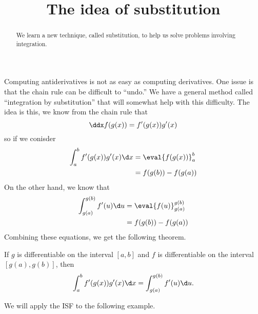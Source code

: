 \documentclass{ximera}
\title[Dig-In:]{The idea of substitution}
\begin{document}
\begin{abstract}
  We learn a new technique, called substitution, to help us solve
  problems involving integration.
\end{abstract}
\maketitle


Computing antiderivatives is not as easy as computing derivatives.
One issue is that the chain rule can be difficult to ``undo.''  We
have a general method called ``integration by substitution'' that will
somewhat help with this difficulty. The idea is this, we know from the
chain rule that
\[
\ddx f(g(x)) = f'(g(x))g'(x)
\]
so if we conisder
\begin{align*}
  \int_a^b f'(g(x))g'(x) \d x &= \eval{f(g(x))}_a^b \\
  &= f(g(b)) - f(g(a)) \\
 \end{align*}
On the other hand, we know that
\begin{align*}
  \int_{g(a)}^{g(b)} f'(u)\d u &= \eval{f(u)}_{g(a)}^{g(b)}\\
  &= f(g(b)) - f(g(a)) \\
 \end{align*}
 Combining these  equations, we get the following theorem. 


\begin{theorem} 
If $g$ is differentiable on the interval $[a,b]$ and $f$ is
differentiable on the interval $[g(a),g(b)]$, then
\[
\int_a^b f'(g(x)) g'(x) \d x =\int_{g(a)}^{g(b)} f'(u) \d u.
\]
\end{theorem}



We will apply the ISF to the following example.
\end{document}
